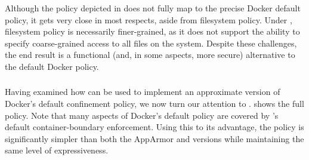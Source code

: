 Although the \bpfbox{} policy depicted in  does not fully
map to the precise Docker default policy, it gets very close in most respects, aside from
filesystem policy. Under \bpfbox{}, filesystem policy is necessarily finer-grained, as it
does not support the ability to specify coarse-grained access to all files on the system.
Despite these challenges, the end result is a functional (and, in some aspects, more
secure) alternative to the default Docker policy.

\subsubsection{\bpfcontain{}}

Having examined how \bpfbox{} can be used to implement an approximate version of Docker's
default confinement policy, we now turn our attention to \bpfcontain{}.
 shows the full \bpfcontain{} policy. Note that many
aspects of Docker's default policy are covered by \bpfcontain{}'s default
container-boundary enforcement. Using this to its advantage, the \bpfcontain{} policy is
significantly simpler than both the AppArmor and \bpfbox{} versions while maintaining the
same level of expressiveness.

